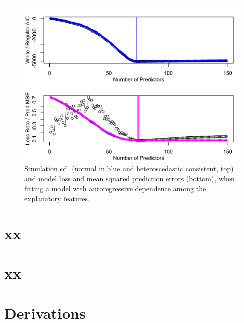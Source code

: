 \documentclass[12pt]{article}
\begin{document}
 \begin{figure}
 \caption{ Simulation of \aic\ (normal in blue and heteroscedastic consistent,
 top) and model loss and mean squared prediction errors (bottom), when fitting a
 model with autoregressive dependence among the explanatory features. }
 \label{fig:example3}
  \centerline{ \includegraphics[width=5in]{figures/leverage/example3.pdf} }
 \end{figure}



\section{ xx }
\label{sec:}


\section{ xx }
\label{sec:}



\section{ Derivations  }
\label{sec:derive}





\end{document}
